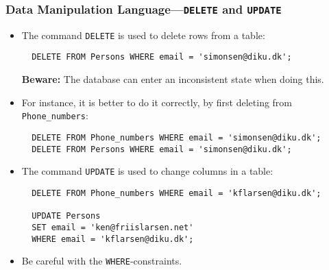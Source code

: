 \documentclass[dvipsnames,handout]{beamer}
\begin{document}
\begin{frame}[fragile=singleslide]
\frametitle{Data Manipulation Language---\texttt{DELETE} and \texttt{UPDATE}}

\begin{itemize}
\item The command \texttt{DELETE} is used to delete rows from a table:

\begin{small}
\begin{verbatim}
  DELETE FROM Persons WHERE email = 'simonsen@diku.dk'; 
\end{verbatim}
\end{small}
\textbf{Beware:} The database can enter an inconsistent state when
doing this.

\item For instance, it is better to do it correctly, by first deleting from
  \texttt{Phone\_numbers}:
\begin{small}
\begin{verbatim}
  DELETE FROM Phone_numbers WHERE email = 'simonsen@diku.dk';
  DELETE FROM Persons WHERE email = 'simonsen@diku.dk'; 
\end{verbatim}
\end{small}

\item The command \texttt{UPDATE} is used to change columns in a table:
\begin{small}
\begin{verbatim}
  DELETE FROM Phone_numbers WHERE email = 'kflarsen@diku.dk';

  UPDATE Persons
  SET email = 'ken@friislarsen.net'
  WHERE email = 'kflarsen@diku.dk';
\end{verbatim}
\end{small}

\item Be careful with the  \texttt{WHERE}-constraints.

\end{itemize}
\end{frame}
\end{document}
